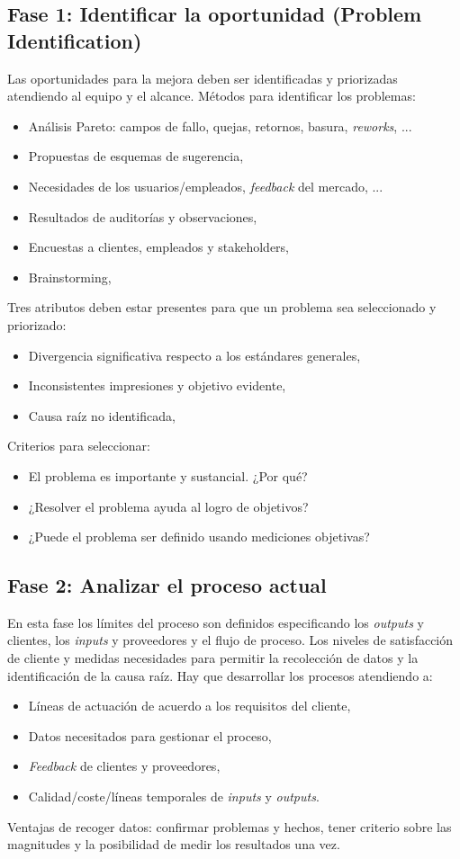 \documentclass[]{article}
\begin{document}
\subsection{Fase 1: Identificar la oportunidad (Problem Identification)}
Las oportunidades para la mejora deben ser identificadas y priorizadas atendiendo al equipo y el alcance. Métodos para identificar los problemas: 
\begin{itemize}
	\item Análisis Pareto: campos de fallo, quejas, retornos, basura, \textit{reworks}, ...
	\item Propuestas de esquemas de sugerencia, 
	\item Necesidades de los usuarios/empleados, \textit{feedback} del mercado, ...
	\item Resultados de auditorías y observaciones,
	\item Encuestas a clientes, empleados y stakeholders,
	\item Brainstorming, 
\end{itemize}
Tres atributos deben estar presentes para que un problema sea seleccionado y priorizado:
\begin{itemize}
	\item Divergencia significativa respecto a los estándares generales,
	\item Inconsistentes impresiones y objetivo evidente,
	\item Causa raíz no identificada,
\end{itemize}
Criterios para seleccionar:
\begin{itemize}
	\item El problema es importante y sustancial. ¿Por qué?
	\item ¿Resolver el problema ayuda al logro de objetivos?
	\item ¿Puede el problema ser definido usando mediciones objetivas?
\end{itemize}

\subsection{Fase 2: Analizar el proceso actual}
En esta fase los límites del proceso son definidos especificando los \textit{outputs} y clientes, los \textit{inputs} y proveedores y el flujo de proceso. Los niveles de satisfacción de cliente y medidas necesidades para permitir la recolección de datos y la identificación de la causa raíz. Hay que desarrollar los procesos atendiendo a: 
\begin{itemize}
	\item Líneas de actuación de acuerdo a los requisitos del cliente,
	\item Datos necesitados para gestionar el proceso,
	\item \textit{Feedback} de clientes y proveedores,
	\item Calidad/coste/líneas temporales de \textit{inputs} y \textit{outputs}.
\end{itemize}
Ventajas de recoger datos: confirmar problemas y hechos, tener criterio sobre las magnitudes y la posibilidad de medir los resultados una vez.
\end{document}
